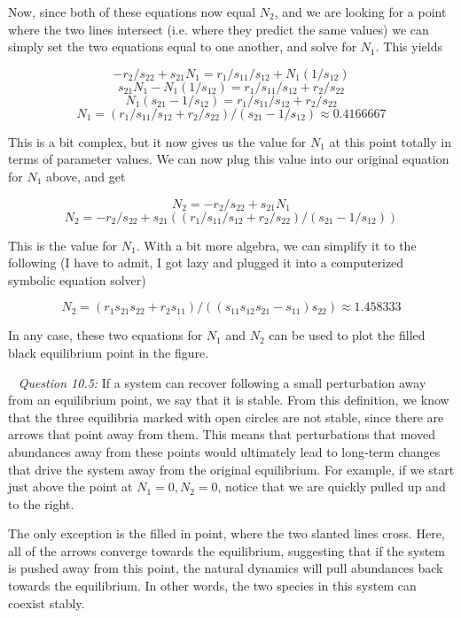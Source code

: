 \documentclass[12pt]{article}
\begin{document}
Now, since both of these equations now equal $N_2$, and we are looking for a point where the two lines intersect (i.e. where they predict the same values) we can simply set the two equations equal to one another, and solve for $N_1$. This yields

$$ -r_2/s_{22} + s_{21} N_1 = r_1/s_{11}/s_{12} + N_1 (1/s_{12}) $$
$$ s_{21} N_1 - N_1 (1/s_{12}) = r_1/s_{11}/s_{12} + r_2/s_{22} $$
$$ N_1 (s_{21} - 1/s_{12}) = r_1/s_{11}/s_{12} + r_2/s_{22} $$
$$ N_1 = (r_1/s_{11}/s_{12} + r_2/s_{22})/(s_{21} - 1/s_{12}) \approx 0.4166667$$

This is a bit complex, but it now gives us the value for $N_1$ at this point totally in terms of parameter values. We can now plug this value into our original equation for $N_1$ above, and get

$$ N_2 = -r_2/s_{22} + s_{21} N_1 $$
$$ N_2 = -r_2/s_{22} + s_{21} ((r_1/s_{11}/s_{12} + r_2/s_{22})/(s_{21} - 1/s_{12})) $$

This is the value for $N_1$. With a bit more algebra, we can simplify it to the following (I have to admit, I got lazy and plugged it into a computerized symbolic equation solver)

$$ N_2 = (r_1 s_{21} s_{22} + r_2 s_{11})/((s_{11} s_{12} s_{21} - s_{11}) s_{22}) \approx 1.458333$$

In any case, these two equations for $N_1$ and $N_2$ can be used to plot the filled black equilibrium point in the figure.

~\newline
\textit{Question 10.5:}
\newline
If a system can recover following a small perturbation away from an equilibrium point, we say that it is stable. From this definition, we know that the three equilibria marked with open circles are not stable, since there are arrows that point away from them. This means that perturbations that moved abundances away from these points would ultimately lead to long-term changes that drive the system away from the original equilibrium. For example, if we start just above the point at $N_1 = 0, N_2 = 0$, notice that we are quickly pulled up and to the right.

The only exception is the filled in point, where the two slanted lines cross. Here, all of the arrows converge towards the equilibrium, suggesting that if the system is pushed away from this point, the natural dynamics will pull abundances back towards the equilibrium. In other words, the two species in this system can coexist stably.
\end{document}
